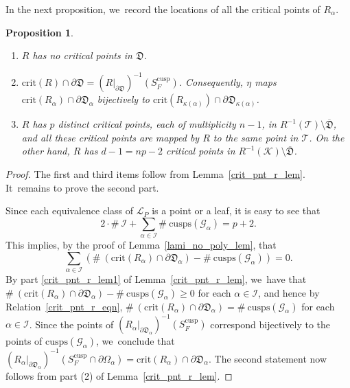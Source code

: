 \documentclass[JEP,XML,SOM,Unicode,NoFloatCountersInSection,published]{cedram}
\newtheorem{proposition}[lemma]{Proposition}
\theoremstyle{definition}
\theoremstyle{remark}
\newcommand{\cT}{\mathcal{T}}
\newcommand{\cK}{\mathcal{K}}
\begin{document}
In the next proposition, we~record the locations of all the critical points of $R_\alpha$.

\skpt
\begin{proposition}\label{crit_pnt_r_sharp_prop}
\begin{enumerate}
\item $R$ has no critical points in $\mathfrak{D}$.

\item $\mathrm{crit}(R)\cap \partial\mathfrak{D}=(R\vert_{\partial\mathfrak{D}})^{-1}(S_F^{\mathrm{cusp}})$.
Consequently, $\eta$ maps $\mathrm{crit}(R_\alpha)\cap \partial\mathfrak{D}_\alpha$ bijectively to $\mathrm{crit}(R_{\kappa(\alpha)})\cap \partial\mathfrak{D}_{\kappa(\alpha)}$.

\item $R$ has $p$ distinct critical points, each of multiplicity $n-1$, in $R^{-1}(\cT)\setminus\overline{\mathfrak{D}}$, and all these critical points are mapped by $R$ to the same point in $\cT$. On the other hand, $R$ has $d-1=np-2$ critical points in $R^{-1}(\cK)\setminus\overline{\mathfrak{D}}$.
\end{enumerate}
\end{proposition}
\begin{proof}
The first and third items follow from Lemma~\ref{crit_pnt_r_lem}. It~remains to prove the second part.

Since each equivalence class of $\mathcal{L}_P$ is a point or a leaf, it is easy to see that
\[
2\cdot \#\ \mathcal{I} + \sum_{\alpha\in\mathcal{I}} \#\ \mathrm{cusps}(\mathcal{G}_\alpha)= p+2.
\]
This implies, by the proof of Lemma~\ref{lami_no_poly_lem}, that
\begin{equation}
\sum_{\alpha\in\mathcal{I}} \left(\#\ \left(\mathrm{crit}\left(R_\alpha\right)\cap \partial\mathfrak{D}_\alpha\right) - \#\ \mathrm{cusps}\left(\mathcal{G}_\alpha\right)\right)=0.
\label{crit_pnt_r_eqn}
\end{equation}
By part \eqref{crit_pnt_r_lem1} of Lemma~\ref{crit_pnt_r_lem}, we~have that $\#\ (\mathrm{crit}(R_\alpha)\cap \partial\mathfrak{D}_\alpha) - \#\ \mathrm{cusps}(\mathcal{G}_\alpha)\geq 0$ for each $\alpha\in\mathcal{I}$, and hence by Relation~\eqref{crit_pnt_r_eqn}, $\#\ (\mathrm{crit}(R_\alpha)\cap \partial\mathfrak{D}_\alpha) = \#\ \mathrm{cusps}(\mathcal{G}_\alpha)$ for each $\alpha\in\mathcal{I}$. Since the points of $(R_\alpha\vert_{\partial\mathfrak{D}_\alpha})^{-1}(S_F^{\mathrm{cusp}})$ correspond bijectively to the points of $\mathrm{cusps}(\mathcal{G}_\alpha)$, we~conclude that $(R_\alpha\vert_{\partial\mathfrak{D}_\alpha})^{-1}(S_F^{\mathrm{cusp}}\cap\partial\Omega_\alpha)= \mathrm{crit}(R_\alpha)\cap \partial\mathfrak{D}_\alpha$.
The second statement now follows from part (2) of Lemma~\ref{crit_pnt_r_lem}.
\end{proof}
\end{document}
